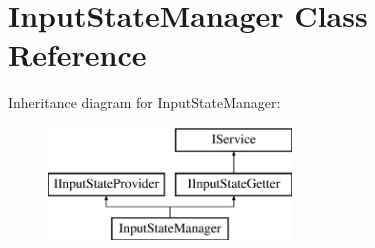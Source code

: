 \hypertarget{classInputStateManager}{}\section{Input\+State\+Manager Class Reference}
\label{classInputStateManager}
Inheritance diagram for Input\+State\+Manager\+:\begin{figure}[H]
\begin{center}
\leavevmode
\includegraphics[height=3.000000cm]{classInputStateManager}
\end{center}
\end{figure}
